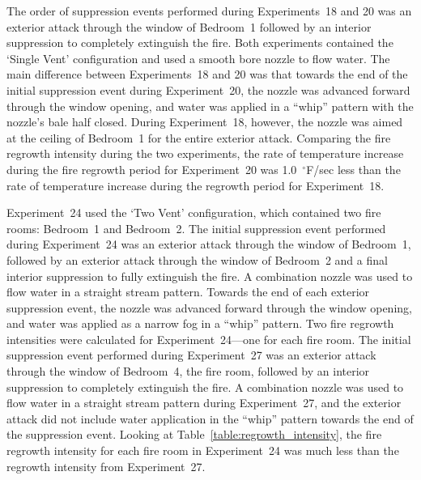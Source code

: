 \documentclass[12pt,oneside]{book}
\begin{document}
The order of suppression events performed during Experiments~18 and 20 was an exterior attack through the window of Bedroom~1 followed by an interior suppression to completely extinguish the fire. Both experiments contained the `Single Vent' configuration and used a smooth bore nozzle to flow water. The main difference between Experiments~18 and 20 was that towards the end of the initial suppression event during Experiment~20, the nozzle was advanced forward through the window opening, and water was applied in a ``whip'' pattern with the nozzle's bale half closed. During Experiment~18, however, the nozzle was aimed at the ceiling of Bedroom~1 for the entire exterior attack. Comparing the fire regrowth intensity during the two experiments, the rate of temperature increase during the fire regrowth period for Experiment~20 was 1.0~$^\circ$F/sec less than the rate of temperature increase during the regrowth period for Experiment~18.

Experiment~24 used the `Two Vent' configuration, which contained two fire rooms: Bedroom~1 and Bedroom~2. The initial suppression event performed during Experiment~24 was an exterior attack through the window of Bedroom~1, followed by an exterior attack through the window of Bedroom~2 and a final interior suppression to fully extinguish the fire. A combination nozzle was used to flow water in a straight stream pattern. Towards the end of each exterior suppression event, the nozzle was advanced forward through the window opening, and water was applied as a narrow fog in a ``whip'' pattern. Two fire regrowth intensities were calculated for Experiment~24---one for each fire room. The initial suppression event performed during Experiment~27 was an exterior attack through the window of Bedroom~4, the fire room, followed by an interior suppression to completely extinguish the fire. A combination nozzle was used to flow water in a straight stream pattern during Experiment~27, and the exterior attack did not include water application in the ``whip'' pattern towards the end of the suppression event. Looking at Table~\ref{table:regrowth_intensity}, the fire regrowth intensity for each fire room in Experiment~24 was much less than the regrowth intensity from Experiment~27.
\end{document}
